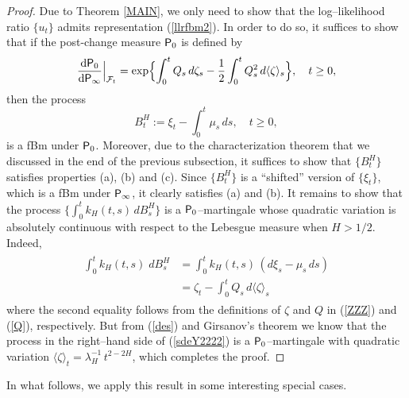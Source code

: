 \documentclass[11pt,reqno]{amsart}
\theoremstyle{remark}
\begin{document}
\vspace{0.2cm}

\begin{proof}
Due to Theorem \ref{MAIN}, we only need to show that the log--likelihood ratio $\{u_{t}\}$ admits representation (\ref{llrfbm2}). In order to do so, 
it suffices to show that if the post-change  measure ${{\sf P}}_{0}$ is defined by 
\begin{equation} \label{des}
\frac{\text{d} {{\sf P}}_{0}}{\text{d}{{\sf P}}_{\infty}} \Big|_{\mathcal{F}_{t}}= \exp \Bigl\{ \int_{0}^{t} Q_{s} \, d\zeta_{s} - \frac{1}{2}  \int_{0}^{t} Q^{2}_{s} \, d\langle \zeta \rangle_{s} \Bigr\}, \quad  t \geq 0,
\end{equation}
then the process
\begin{equation*} 
B^{H}_{t}:= \xi_{t}-\int_{0}^{t} \mu_{s} \, ds, \quad  t \geq 0,
\end{equation*}
is a fBm under ${{\sf P}}_{0}$. Moreover, due to the characterization theorem that we discussed in the end of the previous subsection, it suffices to show that $\{B^{H}_{t}\}$ satisfies properties (a), (b) and (c). Since  $\{B^{H}_{t}\}$ is a ``shifted'' version of $\{\xi_{t}\}$, which is a fBm under ${{\sf P}}_{\infty}$, 
it clearly satisfies (a) and (b). It  remains to show that the process $\{\int_{0}^{t} k_{H}(t,s) \, dB_{s}^{H}\}$ is a ${{\sf P}}_{0}$--martingale whose quadratic variation is absolutely continuous with respect to the Lebesgue measure when $H>1/2$. Indeed, 
\begin{align} \label{sdeY2222}
\begin{split}
 \int_{0}^{t} k_{H}(t,s) \; d B_{s}^{H} &=  \int_{0}^{t} k_{H}(t,s) \, (d\xi_{s}- \mu_{s} \, ds) \\
 &=\zeta_{t}-  \int_{0}^{t} Q_{s} \, d\langle \zeta\rangle_{s}                                                             
\end{split}          
\end{align} 
where the second equality follows from the definitions of $\zeta$ and $Q$ in (\ref{ZZZ}) and (\ref{Q}), respectively. But from (\ref{des}) and Girsanov's theorem we know that the process in the right--hand side of (\ref{sdeY2222}) is a ${{\sf P}}_{0}$--martingale with quadratic variation $\langle \zeta \rangle_{t}=  \lambda^{-1}_{H} \,  t^{2-2H}$, 
which completes the proof. 
\end{proof}

In what follows, we apply this result in some interesting special cases. 
\end{document}
